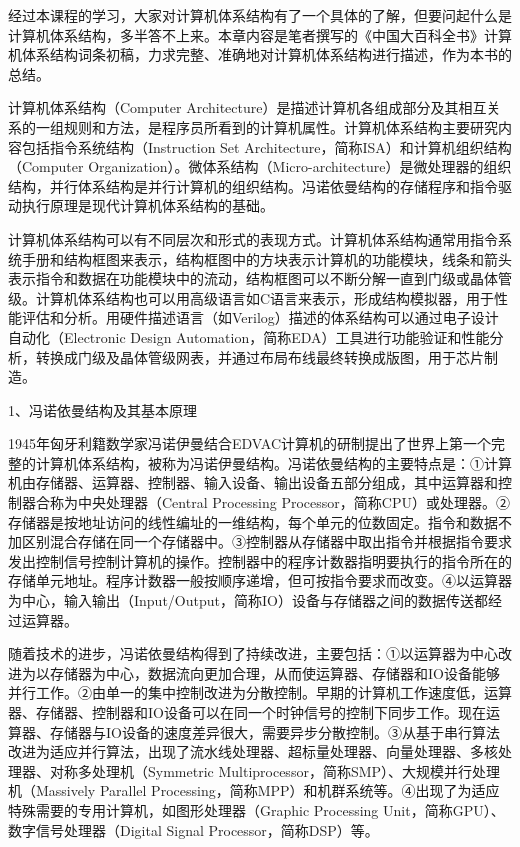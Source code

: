 \documentclass[]{ctexbook}
\begin{document}

经过本课程的学习，大家对计算机体系结构有了一个具体的了解，但要问起什么是计算机体系结构，多半答不上来。本章内容是笔者撰写的《中国大百科全书》计算机体系结构词条初稿，力求完整、准确地对计算机体系结构进行描述，作为本书的总结。

计算机体系结构（Computer Architecture）是描述计算机各组成部分及其相互关系的一组规则和方法，是程序员所看到的计算机属性。计算机体系结构主要研究内容包括指令系统结构（Instruction Set Architecture，简称ISA）和计算机组织结构（Computer Organization）。微体系结构（Micro-architecture）是微处理器的组织结构，并行体系结构是并行计算机的组织结构。冯诺依曼结构的存储程序和指令驱动执行原理是现代计算机体系结构的基础。

计算机体系结构可以有不同层次和形式的表现方式。计算机体系结构通常用指令系统手册和结构框图来表示，结构框图中的方块表示计算机的功能模块，线条和箭头表示指令和数据在功能模块中的流动，结构框图可以不断分解一直到门级或晶体管级。计算机体系结构也可以用高级语言如C语言来表示，形成结构模拟器，用于性能评估和分析。用硬件描述语言（如Verilog）描述的体系结构可以通过电子设计自动化（Electronic Design Automation，简称EDA）工具进行功能验证和性能分析，转换成门级及晶体管级网表，并通过布局布线最终转换成版图，用于芯片制造。

1、冯诺依曼结构及其基本原理

1945年匈牙利籍数学家冯诺伊曼结合EDVAC计算机的研制提出了世界上第一个完整的计算机体系结构，被称为冯诺伊曼结构。冯诺依曼结构的主要特点是：①计算机由存储器、运算器、控制器、输入设备、输出设备五部分组成，其中运算器和控制器合称为中央处理器（Central Processing Processor，简称CPU）或处理器。②存储器是按地址访问的线性编址的一维结构，每个单元的位数固定。指令和数据不加区别混合存储在同一个存储器中。③控制器从存储器中取出指令并根据指令要求发出控制信号控制计算机的操作。控制器中的程序计数器指明要执行的指令所在的存储单元地址。程序计数器一般按顺序递增，但可按指令要求而改变。④以运算器为中心，输入输出（Input/Output，简称IO）设备与存储器之间的数据传送都经过运算器。

随着技术的进步，冯诺依曼结构得到了持续改进，主要包括：①以运算器为中心改进为以存储器为中心，数据流向更加合理，从而使运算器、存储器和IO设备能够并行工作。②由单一的集中控制改进为分散控制。早期的计算机工作速度低，运算器、存储器、控制器和IO设备可以在同一个时钟信号的控制下同步工作。现在运算器、存储器与IO设备的速度差异很大，需要异步分散控制。③从基于串行算法改进为适应并行算法，出现了流水线处理器、超标量处理器、向量处理器、多核处理器、对称多处理机（Symmetric Multiprocessor，简称SMP）、大规模并行处理机（Massively Parallel Processing，简称MPP）和机群系统等。④出现了为适应特殊需要的专用计算机，如图形处理器（Graphic Processing Unit，简称GPU）、数字信号处理器（Digital Signal Processor，简称DSP）等。
\end{document}
